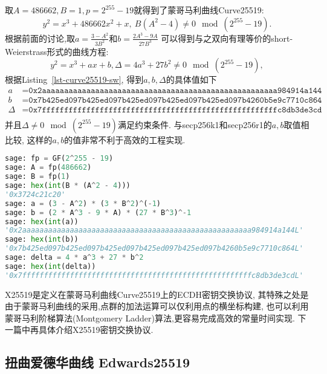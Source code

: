 取$A = 486662, B = 1, p = 2^{255}-19$就得到了蒙哥马利曲线Curve25519:
$$
y^2 = x^3 + 486662x^2 + x,\  B(A^2-4)\neq 0 \mod (2^{255}-19).
$$
根据前面的讨论,取$a = \frac{3-A^2}{3B^2}$和$b = \frac{2A^3 - 9A}{27B^3}$
可以得到与之双向有理等价的short-Weierstrass形式的曲线方程:
$$
y^2 = x^3 + ax + b, \Delta = 4a^3 + 27b^2 \neq 0\mod (2^{255}-19),
$$
根据Listing~\ref{lst-curve25519-sw}, 得到$a,b,\Delta$的具体值如下
\begin{equation*}
\begin{array}{rl}
a & = \texttt{0x2aaaaaaaaaaaaaaaaaaaaaaaaaaaaaaaaaaaaaaaaaaaaaaaaaaaaa984914a144} \\
b & = \texttt{0x7b425ed097b425ed097b425ed097b425ed097b425ed097b4260b5e9c7710c864} \\
\Delta &= \texttt{0x7fffffffffffffffffffffffffffffffffffffffffffffffffffffc8db3de3cd}\\
\end{array}
\end{equation*}
并且$\Delta\neq 0\mod (2^{255}-19)$满足约束条件.
与secp256k1和secp256r1的$a,b$取值相比较, 这样的$a,b$的值非常不利于高效的工程实现.

\begin{lstlisting}[language = python, caption = Curve25519曲线的short-Weierstrass形式的曲线参数,label=lst-curve25519-sw]
sage: fp = GF(2^255 - 19)
sage: A = fp(486662)
sage: B = fp(1)
sage: hex(int(B * (A^2 - 4)))
'0x3724c21c20'
sage: a = (3 - A^2) * (3 * B^2)^(-1)
sage: b = (2 * A^3 - 9 * A) * (27 * B^3)^-1
sage: hex(int(a))
'0x2aaaaaaaaaaaaaaaaaaaaaaaaaaaaaaaaaaaaaaaaaaaaaaaaaaaaa984914a144L'
sage: hex(int(b))
'0x7b425ed097b425ed097b425ed097b425ed097b425ed097b4260b5e9c7710c864L'
sage: delta = 4 * a^3 + 27 * b^2
sage: hex(int(delta))
'0x7fffffffffffffffffffffffffffffffffffffffffffffffffffffc8db3de3cdL'
\end{lstlisting}

X25519是定义在蒙哥马利曲线Curve25519上的ECDH密钥交换协议,
其特殊之处是由于蒙哥马利曲线的采用,点群的加法运算可以仅利用点的横坐标构建,
也可以利用蒙哥马利阶梯算法(Montgomery Ladder)算法,更容易完成高效的常量时间实现.
下一篇中再具体介绍X25519密钥交换协议.

\subsection{扭曲爱德华曲线 Edwards25519}

